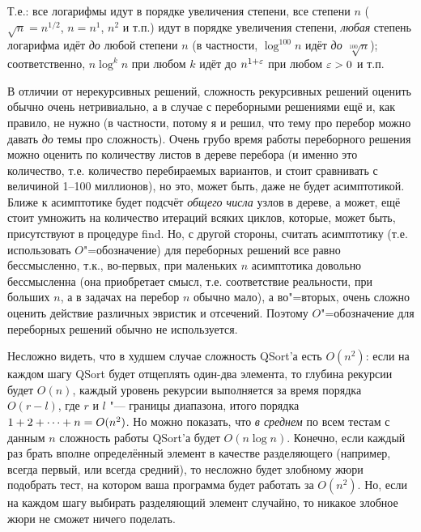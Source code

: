 {Т.е.: все логарифмы идут в порядке увеличения степени, все степени $n$ 
($\sqrt n=n^{1/2}$, $n=n^1$, $n^2$ и т.п.) идут в порядке увеличения степени, 
\textit{любая} степень логарифма идёт \textit{до} любой степени $n$ (в 
частности, $\log^{100} n$ идёт \textit{до} $\sqrt[100] n$);  
соответственно, $n\log^k n$ при любом $k$ идёт до $n^{1+\varepsilon}$ при любом 
$\varepsilon>0$ и т.п.

 В отличии от нерекурсивных решений, сложность 
рекурсивных решений оценить обычно очень нетривиально, а в случае с переборными 
решениями ещё и, как правило, не нужно (в частности, потому я и 
решил, что тему про перебор можно давать \textit{до} темы про сложность). Очень 
грубо время работы переборного решения можно оценить по количеству листов в дереве перебора (и 
именно это количество, т.е. количество перебираемых вариантов, и стоит 
сравнивать с величиной 1--100 миллионов), но это, 
может быть, даже не будет асимптотикой. Ближе к асимптотике будет подсчёт 
\textit{общего числа} узлов в дереве, а может, ещё стоит умножить на количество 
итераций всяких циклов, которые, может быть, присутствуют в процедуре find. Но, 
с другой стороны, считать асимптотику (т.е. использовать $O$"=обозначение) для 
переборных решений все равно бессмысленно, т.к., во-первых, при маленьких $n$ 
асимптотика довольно бессмысленна (она приобретает смысл, т.е. соответствие 
реальности, при больших $n$, а в задачах на перебор $n$ обычно мало), а 
во"=вторых, очень сложно оценить действие различных эвристик и отсечений. 
Поэтому $O$"=обозначение для переборных решений обычно не используется. 


 Несложно видеть, что в худшем случае сложность 
QSort'а есть $O(n^2)$: если на каждом шагу QSort будет отщеплять один-два 
элемента, то глубина рекурсии будет $O(n)$, каждый уровень рекурсии выполняется 
за время порядка $O(r-l)$, где $r$ и $l$ "--- границы диапазона, итого порядка 
$1+2+\dots+n\hm=O(n^2)$. Но можно показать, что \textit{в среднем} по всем 
тестам с данным $n$  сложность работы QSort'а будет $O(n \log n)$. Конечно, 
если каждый раз брать вполне определённый элемент в качестве разделяющего 
(например, всегда первый, или всегда средний), то несложно будет злобному жюри 
подобрать тест, на котором ваша программа будет работать за $O(n^2)$. Но, 
если на каждом шагу выбирать разделяющий элемент случайно, то никакое злобное 
жюри не сможет ничего поделать.

}
